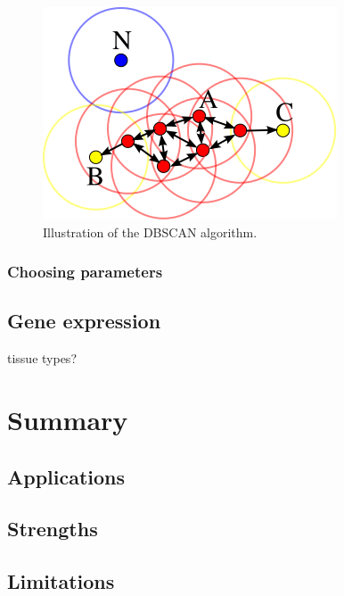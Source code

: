 \documentclass[]{book}
\theoremstyle{definition}
\theoremstyle{definition}
\theoremstyle{definition}
\theoremstyle{remark}
\begin{document}
\begin{figure}

{\centering \includegraphics[width=0.75\linewidth]{images/DBSCAN_Illustration} 

}

\caption{Illustration of the DBSCAN algorithm.}\label{fig:dbscanIllustration}
\end{figure}

\subsubsection{Choosing parameters}\label{choosing-parameters}

\subsection{Gene expression}\label{gene-expression}

tissue types?

\section{Summary}\label{summary}

\subsection{Applications}\label{applications}

\subsection{Strengths}\label{strengths}

\subsection{Limitations}\label{limitations}
\end{document}
